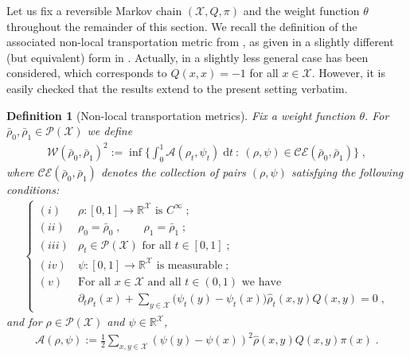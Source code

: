 \documentclass[a4paper,11pt,reqno]{amsart}
\theoremstyle{plain}
\newtheorem{definition}[theorem]{Definition}
\theoremstyle{remark}
\numberwithin{equation}{section}
\begin{document}
Let us fix a reversible Markov chain $({\mathcal{X}}, Q, \pi)$ and the weight
function $\theta$ throughout the remainder of this section.  We recall
the definition of the associated non-local transportation metric from
\cite{Ma11}, as given in a slightly different (but equivalent) form in
\cite{EM11}.  Actually, in \cite{Ma11,EM11} a slightly less general
case has been considered, which corresponds to $Q(x,x) = -1$ for all
$x \in {\mathcal{X}}$. However, it is easily checked that the results extend to
the present setting verbatim.
\begin{definition}[Non-local transportation
  metrics]\label{def:metric}
Fix a weight function $\theta$.
For $\bar\rho_0, \bar\rho_1 \in {{\mathscr{P}}({\mathcal{X}})}$ we define 
\begin{align*}
  {\mathcal{W}}(\bar\rho_0, \bar\rho_1)^2 := 
  \inf \bigg\{ \int_0^1 {\mathcal{A}}(\rho_t, \psi_t) {\; \mathrm{d}} t \ : \ {(\rho, \psi) \in {\mathcal{CE}}(\bar\rho_0,\bar\rho_1)} \bigg\}\;,
\end{align*}
where ${\mathcal{CE}}(\bar\rho_0,\bar\rho_1)$ denotes the collection
of pairs $(\rho,\psi)$ satisfying the following conditions:
\begin{align} 
\label{eq:conditions} 
 \left\{ 
 \begin{array}{ll}
{(i)} & \rho : [0,1] \to {{\mathbb R}}^{\mathcal{X}}  \text{ is }C^\infty\;;\\ 
{(ii)} &  \rho_0 = \bar\rho_0\;, \qquad \rho_1 = \bar\rho_1\;; \\
{(iii)} &  \rho_t \in {{\mathscr{P}}({\mathcal{X}})} \text{ for all $t \in [0,1]$}\;;\\
{(iv)} & \psi  : [0,1] \to {{\mathbb R}}^{\mathcal{X}}  \text{ is measurable}\;;\\ 
{(v)} &  \text{For all $x \in {\mathcal{X}}$ and all $t\in (0,1)$ we have}\\
       &\displaystyle{\partial_t \rho_t(x) 
         + \sum_{y \in {\mathcal{X}}}
         \big(\psi_t(y) - \psi_t(x)\big){\hat\rho}_t(x,y) Q(x,y) = 0}\;,
\end{array} 
\right.
\end{align}
and for $\rho\in{{\mathscr{P}}({\mathcal{X}})}$ and $\psi \in {{\mathbb R}}^{\mathcal{X}}$,
\begin{align*}
 {\mathcal{A}}(\rho,\psi) 
 := 
   \frac12\sum_{x,y\in {\mathcal{X}}} (\psi(y)-\psi(x))^2{\hat\rho}(x,y) Q(x,y) \pi(x)\;.
\end{align*}
\end{definition}
\end{document}
